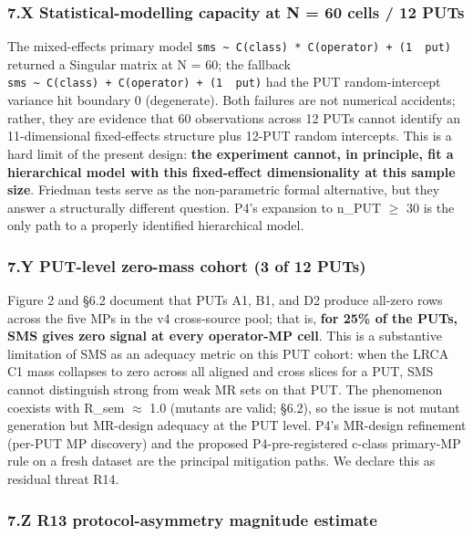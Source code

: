 \documentclass[review,12pt,authoryear]{elsarticle}
\begin{document}
\subsubsection{7.X Statistical-modelling capacity at N = 60 cells / 12
PUTs}\label{x-statistical-modelling-capacity-at-n-60-cells-12-puts}

The mixed-effects primary model
\texttt{sms\ \textasciitilde{}\ C(class)\ *\ C(operator)\ +\ (1\ \textbar{}\ put)}
returned a Singular matrix at N = 60; the fallback
\texttt{sms\ \textasciitilde{}\ C(class)\ +\ C(operator)\ +\ (1\ \textbar{}\ put)}
had the PUT random-intercept variance hit boundary 0 (degenerate). Both
failures are not numerical accidents; rather, they are evidence that 60
observations across 12 PUTs cannot identify an 11-dimensional
fixed-effects structure plus 12-PUT random intercepts. This is a hard
limit of the present design: \textbf{the experiment cannot, in
principle, fit a hierarchical model with this fixed-effect
dimensionality at this sample size}. Friedman tests serve as the
non-parametric formal alternative, but they answer a structurally
different question. P4's expansion to n\_PUT $\geq$ 30 is the only path to a
properly identified hierarchical model.

\subsubsection{7.Y PUT-level zero-mass cohort (3 of 12
PUTs)}\label{y-put-level-zero-mass-cohort-3-of-12-puts}

Figure 2 and §6.2 document that PUTs A1, B1, and D2 produce all-zero
rows across the five MPs in the v4 cross-source pool; that is,
\textbf{for 25\% of the PUTs, SMS gives zero signal at every operator-MP
cell}. This is a substantive limitation of SMS as an adequacy metric on
this PUT cohort: when the LRCA C1 mass collapses to zero across all
aligned and cross slices for a PUT, SMS cannot distinguish strong from
weak MR sets on that PUT. The phenomenon coexists with R\_sem $\approx$ 1.0
(mutants are valid; §6.2), so the issue is not mutant generation but
MR-design adequacy at the PUT level. P4's MR-design refinement (per-PUT
MP discovery) and the proposed P4-pre-registered c-class primary-MP rule
on a fresh dataset are the principal mitigation paths. We declare this
as residual threat R14.

\subsubsection{7.Z R13 protocol-asymmetry magnitude
estimate}\label{z-r13-protocol-asymmetry-magnitude-estimate}
\end{document}
